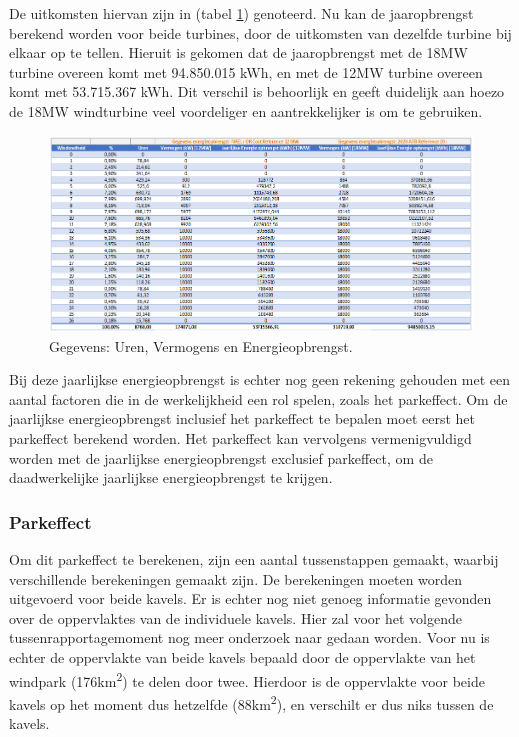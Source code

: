 De uitkomsten hiervan zijn in (tabel \ref{fig:Jaaropbrengst}) genoteerd. Nu kan de jaaropbrengst berekend worden voor beide turbines, door de uitkomsten van dezelfde turbine bij elkaar op te tellen. Hieruit is gekomen dat de jaaropbrengst met de 18MW turbine overeen komt met 94.850.015 kWh, en met de 12MW turbine overeen komt met 53.715.367 kWh. Dit verschil is behoorlijk en geeft duidelijk aan hoezo de 18MW windturbine veel voordeliger en aantrekkelijker is om te gebruiken. 
\begin{figure}[H]
\centering
\includegraphics[width=1\textwidth]{IMG/data/overzicht/Jaaropbrengst.PNG}
\caption{Gegevens: Uren, Vermogens en Energieopbrengst.}
\label{fig:Jaaropbrengst}
\end{figure}
Bij deze jaarlijkse energieopbrengst is echter nog geen rekening gehouden met een aantal factoren die in de werkelijkheid een rol spelen, zoals het parkeffect. Om de jaarlijkse energieopbrengst inclusief het parkeffect te bepalen moet eerst het parkeffect berekend worden. Het parkeffect kan vervolgens vermenigvuldigd worden met de jaarlijkse energieopbrengst exclusief parkeffect, om de daadwerkelijke jaarlijkse energieopbrengst te krijgen. 

\subsubsection{Parkeffect}
Om dit parkeffect te berekenen, zijn een aantal tussenstappen gemaakt, waarbij verschillende berekeningen gemaakt zijn. De berekeningen moeten worden uitgevoerd voor beide kavels. Er is echter nog niet genoeg informatie gevonden over de oppervlaktes van de individuele kavels. Hier zal voor het volgende tussenrapportagemoment nog meer onderzoek naar gedaan worden. Voor nu is echter de oppervlakte van beide kavels bepaald door de oppervlakte van het windpark (176km\textsuperscript{2}) te delen door twee. Hierdoor is de oppervlakte voor beide kavels op het moment dus hetzelfde (88km\textsuperscript{2}), en verschilt er dus niks tussen de kavels. 

